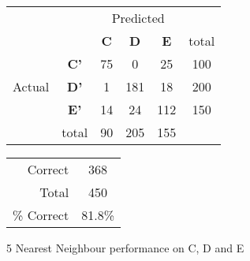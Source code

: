 	
\begin{figure}[!ht]
\begin{minipage}[b]{0.5\linewidth}
\centering
	\begin{tabular}{ccc|c|c|c}
	 & &\multicolumn{3}{c}{Predicted} &\\
	  & & \bf{C} &  \bf{D} & \bf{E} & total \\
	 \cline{3-6}
	 \multirow{3}{*}{\begin{sideways}Actual\end{sideways}} & \bf{C'}& 75 & 0 & 25 & 100\\
	 \cline{3-6}
	 & \bf{D'}& 1 & 181 & 18 & 200\\
	  \cline{3-6}
	 & \bf{E'}& 14 & 24 & 112 &  150\\
	  \cline{3-6}
	 &total&90&205&155\\
	\end{tabular}
\end{minipage}
\hspace{0.5cm}
\begin{minipage}[b]{0.5\linewidth}
	\begin{tabular}{r|c}
	\hline
	Correct& 368\\
	Total& 450\\
	\hline
	\% Correct& 81.8\%\\
	\hline
	\end{tabular}
\end{minipage}
\vspace{1mm}
\caption{5 Nearest Neighbour performance on C, D and E}
\end{figure}
 
 
\clearpage
